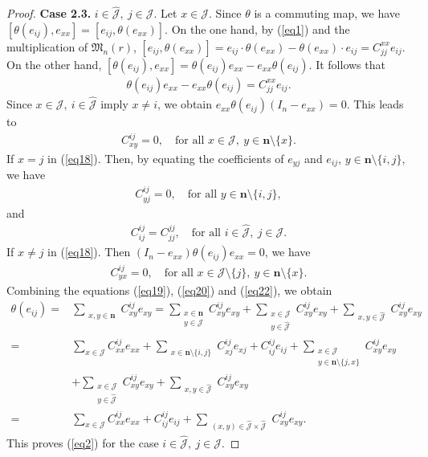\documentclass[10pt,a4paper]{amsart}
\begin{document}
\begin{proof}
\textbf{Case 2.3.} $i \in \hat{\mathcal{J}},~j \in \mathcal{J}$. Let $x \in \mathcal{J}$. Since $\theta$ is a commuting map, we have $[\theta(e_{ij}), e_{xx}] = [e_{ij}, \theta(e_{xx})]$.
On the one hand, by (\ref{eq1}) and the multiplication of $\mathfrak{M}_n(r)$, $[e_{ij}, \theta(e_{xx})] = e_{ij} \cdot  \theta(e_{xx}) - \theta(e_{xx}) \cdot  e_{ij} = C_{jj}^{xx} e_{ij}$.
On the other hand, $[\theta(e_{ij}), e_{xx}] = \theta(e_{ij}) e_{xx} - e_{xx} \theta(e_{ij})$. It follows that
 \begin{align}\label{eq18}
\theta(e_{ij}) e_{xx} - e_{xx} \theta(e_{ij}) = C_{jj}^{xx} e_{ij}.
 \end{align}
Since $x \in \mathcal{J},~i \in \hat{\mathcal{J}}$ imply $x \neq i$, we obtain $e_{xx} \theta(e_{ij}) (I_n - e_{xx}) = 0$. This leads to
 \begin{align}\label{eq19}
C_{xy}^{ij} = 0, \quad \text{for all } x \in \mathcal{J}, ~y \in \mathbf{n} \setminus \{x\}.  
\end{align}
If $x = j$ in (\ref{eq18}). Then, by equating the coefficients of $e_{yj}$ and $e_{ij}$, $y \in \mathbf{n} \setminus \{i, j\}$, we have
 \begin{align}\label{eq20}
C_{yj}^{ij} = 0, \quad \text{for all } y \in \mathbf{n} \setminus \{i, j\},
 \end{align}
and
 \begin{align}\label{eq21}
C_{ij}^{ij} = C_{jj}^{jj}, \quad \text{for all } i \in \hat{\mathcal{J}}, ~j \in \mathcal{J}. 
 \end{align}
If $x \neq j$ in (\ref{eq18}). Then $(I_n - e_{xx}) \theta(e_{ij}) e_{xx} = 0$, we have
 \begin{align}\label{eq22}
C_{yx}^{ij} = 0, \quad \text{for all } x \in \mathcal{J} \setminus \{j\},~ y \in \mathbf{n} \setminus \{x\} .
\end{align}
Combining the equations (\ref{eq19}), (\ref{eq20}) and (\ref{eq22}), we obtain
\[
\begin{aligned}
\theta(e_{ij})
=& \sum_{\substack{x,y \in \mathbf{n}}} C_{xy}^{ij} e_{xy}
= \sum_{\substack{x \in \mathbf{n} \\ y \in \mathcal{J}}} C_{xy}^{ij} e_{xy}+ \sum_{\substack{x \in \mathcal{J} \\ y \in \hat{\mathcal{J}}}} C_{xy}^{ij} e_{xy} +\sum_{\substack{x,y \in \hat{\mathcal{J}}}} C_{xy}^{ij} e_{xy}\\
=&\sum_{x \in \mathcal{J}} C_{xx}^{ij} e_{xx} + \sum_{\substack{x \in \mathbf{n}\setminus \{i,j\} }} C_{xj}^{ij} e_{xj}+C_{ij}^{ij} e_{ij}+\sum_{\substack{x \in \mathcal{J} \\y \in \mathbf{n}\setminus \{j, x\} }} C_{xy}^{ij} e_{xy} \\
&+\sum_{\substack{x \in \mathcal{J}\\y \in \hat{\mathcal{J}} }} C_{xy}^{ij} e_{xy}+ \sum_{\substack{x,y \in \hat{\mathcal{J}}}} C_{xy}^{ij} e_{xy}  \\
=& \sum_{x \in \mathcal{J}} C_{xx}^{ij} e_{xx} + C_{ij}^{ij} e_{ij} + 
 \sum_{\substack{(x,y) \in \hat{\mathcal{J}}\times \hat{\mathcal{J}}}} C_{xy}^{ij} e_{xy}.
\end{aligned}
\]
This proves (\ref{eq2}) for the case $i \in \hat{\mathcal{J}}, ~j \in \mathcal{J}$.


\end{proof}
\end{document}
